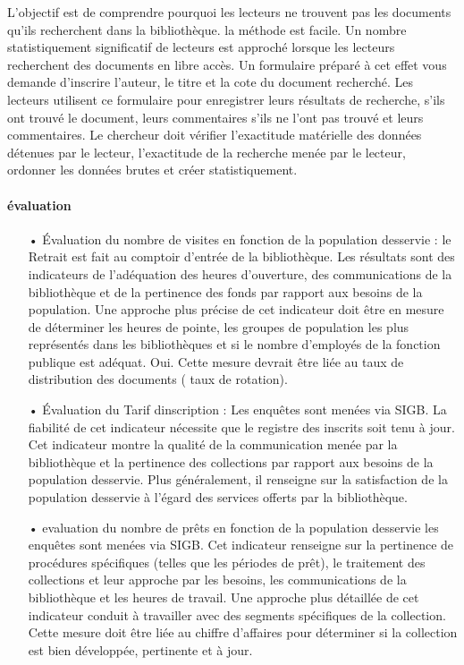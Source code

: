 \documentclass[french,a4paper,12pt]{article}
\begin{document}
{ \quad L'objectif est de comprendre pourquoi les lecteurs ne trouvent pas les documents qu'ils recherchent dans la bibliothèque. la méthode est facile. Un nombre statistiquement significatif de lecteurs est approché lorsque les lecteurs recherchent des documents en libre accès. Un formulaire préparé à cet effet vous demande d'inscrire l'auteur, le titre et la cote du document recherché. Les lecteurs utilisent ce formulaire pour enregistrer leurs résultats de recherche, s'ils ont trouvé le document, leurs commentaires s'ils ne l'ont pas trouvé et leurs commentaires. Le chercheur doit vérifier l'exactitude matérielle des données détenues par le lecteur, l'exactitude de la recherche menée par le lecteur, ordonner les données brutes et créer statistiquement.
 
 \paragraph{évaluation}  
 
 \begin{enumerate}
  \item[•]  Évaluation du  nombre de visites en fonction de la population desservie : le Retrait est fait au comptoir d'entrée de la bibliothèque. Les résultats sont des indicateurs de l'adéquation des heures d'ouverture, des communications de la bibliothèque et de la pertinence des fonds par rapport aux besoins de la population. Une approche plus précise de cet indicateur doit être en mesure de déterminer les heures de pointe, les groupes de population les plus représentés dans les bibliothèques et si le nombre d'employés de la fonction publique est adéquat. Oui. Cette mesure devrait être liée au taux de distribution des documents ( taux de rotation). 
  
 \item[•] Évaluation du Tarif dinscription   : Les enquêtes sont menées via SIGB. La fiabilité de cet indicateur nécessite que le registre des inscrits soit tenu à jour. Cet indicateur montre la qualité de la communication menée par la bibliothèque et la pertinence des collections par rapport aux besoins de la population desservie. Plus généralement, il renseigne sur la satisfaction de la population desservie à l'égard des services offerts par la bibliothèque. 
 
  \item[•]evaluation du  nombre de prêts en fonction de la population desservie les enquêtes sont menées via SIGB. Cet indicateur renseigne sur la pertinence de procédures spécifiques (telles que les périodes de prêt), le traitement des collections et leur approche par les besoins, les communications de la bibliothèque et les heures de travail. Une approche plus détaillée de cet indicateur conduit à travailler avec des segments spécifiques de la collection. Cette mesure doit être liée au chiffre d'affaires pour déterminer si la collection est bien développée, pertinente et à jour. 
  

\end{enumerate}}
\end{document}
